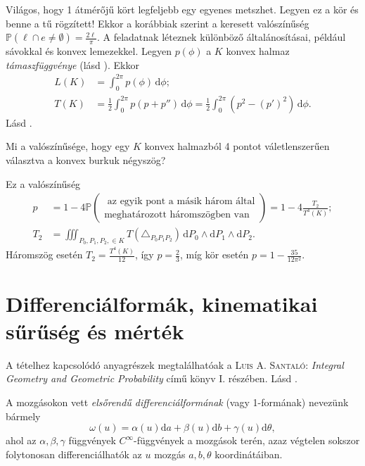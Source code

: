 \documentclass[%
	DIV=15,appendixprefix]{scrreprt}
\theoremstyle{definition}
\theoremstyle{remark}
\newcommand{\prob}{\mathbb{P}}
\begin{document}
Világos, hogy 1 átmérőjű kört legfeljebb egy egyenes metszhet. Legyen ez a kör és benne a tű
rögzített! Ekkor a korábbiak szerint a keresett valószínűség $ \prob \left( \ell \cap e \neq
\emptyset\right) = \frac{ 2 \ell }{ \pi } $. A feladatnak léteznek különböző általánosításai,
például sávokkal és konvex lemezekkel.
%
Legyen $ p \left( \phi \right) $ a $ K $ konvex halmaz \emph{támaszfüggvénye} (lásd
\cite[1.~fejezet, 2.~szakasz, 3--4.~oldal]{Santalo}). Ekkor
\begin{align*}
	L \left( K \right) &= \int_{ 0 }^{ 2 \pi } p \left( \phi \right) \, \mathrm{ d } \phi;\\
	T \left( K \right) &= \frac{ 1 }{ 2 } \int_{ 0 }^{ 2 \pi } p \left( p + p'' \right) \,
	\mathrm{ d } \phi = \frac{ 1 }{ 2 } \int_{ 0 }^{ 2 \pi } \left( p^{ 2 } - \left( p'
		\right)^{ 2 } \right) \, \mathrm{ d } \phi.
\end{align*}
%
Lásd \cite[4.~fejezet, 5.~szakasz, 63--65.~oldal]{Santalo}.

Mi a valószínűsége, hogy egy $ K $ konvex halmazból 4 pontot váletlenszerűen választva a konvex
burkuk négyszög?

Ez a valószínűség
\begin{align*}
	p &= 1 - 4 \prob \left( \substack{\text{ az egyik pont a másik három által}\\\text{meghatározott
	háromszögben van}} \right) = 1 - 4 \frac{ T_{ 2 } }{ T^{ 4 } \left( K \right) };\\
	T_{ 2 } &= \iiint_{P_{ 0 },{} P_{ 1 },{} P_{ 2 },{} \in K } T \left( \triangle_{ P_{ 0 }
	P_{ 1 }P_{ 2 } } \right) \, \mathrm{ d } P_{ 0 } \wedge  \mathrm{ d } P_{ 1 } \wedge
	\mathrm{ d } P_{ 2 }.
\end{align*}
Háromszög esetén $ T_{ 2 } = \frac{ T^{ 4 } \left( K \right) }{ 12 } $, így $ p = \frac{ 2 }{ 3 } $,
míg kör esetén $ p = 1 - \frac{ 35 }{ 12 \pi^{ 2 } } $.
%
\section{Differenciálformák, kinematikai sűrűség és mérték}
%
A tételhez kapcsolódó anyagrészek megtalálhatóak a \textsc{Luis A. Santaló}: \emph{Integral Geometry
and Geometric Probability} \cite{Santalo} című könyv I. részében.
%
Lásd \cite[6.~fejezet, 2.~szakasz, 82--84.~oldal]{Santalo}.

A mozgásokon vett \emph{elsőrendű differenciálformának} (vagy 1-formának) nevezünk bármely
\begin{equation*}
	\omega \left( u \right) = \alpha \left( u \right) \mathrm{ d } a + \beta \left( u \right)
	\mathrm{ d } b + \gamma \left( u \right) \mathrm{ d } \theta,
\end{equation*}
ahol az $ \alpha,{} \beta,{} \gamma $ függvények $ C^{ \infty } $-függvények a mozgások terén, azaz
végtelen sokszor folytonosan differenciálhatók az $ u $ mozgás $ a,{} b,{} \theta $ koordinátáiban.
\end{document}
